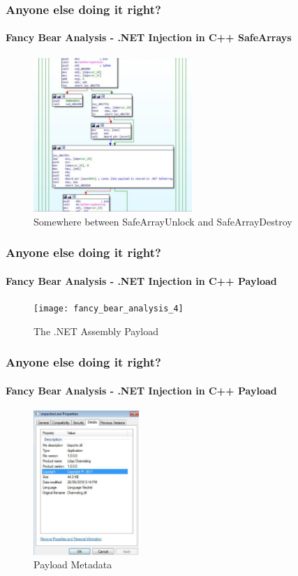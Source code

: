 \documentclass[aspectratio=169]{beamer}
\begin{document}
\begin{frame}
  \frametitle{Anyone else doing it right?}
  \framesubtitle{Fancy Bear Analysis - .NET Injection in C++ SafeArrays}
  \begin{center}
    \begin{figure}
      \includegraphics[width=6cm,keepaspectratio]{fancy_bear_analysis_3}
      \caption{Somewhere between SafeArrayUnlock and SafeArrayDestroy}
    \end{figure}
  \end{center}
\end{frame}

\begin{frame}
  \frametitle{Anyone else doing it right?}
  \framesubtitle{Fancy Bear Analysis - .NET Injection in C++ Payload}
  \begin{center}
    \begin{figure}
      \texttt{[image: fancy\_bear\_analysis\_4]}
      \caption{The .NET Assembly Payload}
    \end{figure}
  \end{center}
\end{frame}

\begin{frame}
  \frametitle{Anyone else doing it right?}
  \framesubtitle{Fancy Bear Analysis - .NET Injection in C++ Payload}
  \begin{center}
    \begin{figure}
      \includegraphics[width=4cm,keepaspectratio]{fancy_bear_analysis_5}
      \caption{Payload Metadata}
    \end{figure}
  \end{center}
\end{frame}
\end{document}
